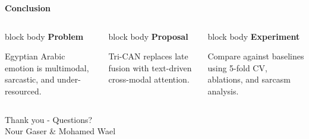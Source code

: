 \documentclass[aspectratio=169,10pt]{beamer}
\begin{document}
{
\begin{frame}[plain]
\vspace{0.65cm}
\begin{center}
{\color{white}\LARGE\bfseries Conclusion}\\[0.55cm]
\end{center}
\begin{columns}[T,onlytextwidth]
\begin{beamercolorbox}[rounded=true,sep=0.35cm,wd=\linewidth]{block body}
\textbf{Problem}\par
Egyptian Arabic emotion is multimodal, sarcastic, and under-resourced.
\end{beamercolorbox}
\begin{beamercolorbox}[rounded=true,sep=0.35cm,wd=\linewidth]{block body}
\textbf{Proposal}\par
Tri-CAN replaces late fusion with text-driven cross-modal attention.
\end{beamercolorbox}
\begin{beamercolorbox}[rounded=true,sep=0.35cm,wd=\linewidth]{block body}
\textbf{Experiment}\par
Compare against baselines using 5-fold CV, ablations, and sarcasm analysis.
\end{beamercolorbox}
\end{columns}
\vspace{0.65cm}
\begin{center}
{\color{AccentBlue!25!white}\Large Thank you - Questions?}\\[0.25cm]
{\color{white!70}\small Nour Gaser \quad \& \quad Mohamed Wael}
\end{center}
\end{frame}
}
\end{document}
